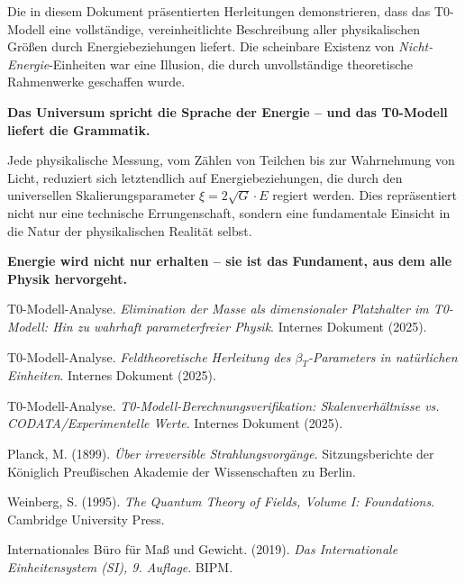 \documentclass[12pt,a4paper]{article}
\newcommand{\xipar}{\xi}
\begin{document}
	Die in diesem Dokument präsentierten Herleitungen demonstrieren, dass das T0-Modell eine vollständige, vereinheitlichte Beschreibung aller physikalischen Größen durch Energiebeziehungen liefert. Die scheinbare Existenz von \textit{Nicht-Energie}-Einheiten war eine Illusion, die durch unvollständige theoretische Rahmenwerke geschaffen wurde.
	
	\textbf{Das Universum spricht die Sprache der Energie -- und das T0-Modell liefert die Grammatik.}
	
	Jede physikalische Messung, vom Zählen von Teilchen bis zur Wahrnehmung von Licht, reduziert sich letztendlich auf Energiebeziehungen, die durch den universellen Skalierungsparameter $\xipar = 2\sqrt{G} \cdot E$ regiert werden. Dies repräsentiert nicht nur eine technische Errungenschaft, sondern eine fundamentale Einsicht in die Natur der physikalischen Realität selbst.
	
	\textbf{Energie wird nicht nur erhalten -- sie ist das Fundament, aus dem alle Physik hervorgeht.}
	
	\begin{thebibliography}{9}
		T0-Modell-Analyse. \textit{Elimination der Masse als dimensionaler Platzhalter im T0-Modell: Hin zu wahrhaft parameterfreier Physik}. Internes Dokument (2025).
		
		T0-Modell-Analyse. \textit{Feldtheoretische Herleitung des $\beta_T$-Parameters in natürlichen Einheiten}. Internes Dokument (2025).
		
		T0-Modell-Analyse. \textit{T0-Modell-Berechnungsverifikation: Skalenverhältnisse vs. CODATA/Experimentelle Werte}. Internes Dokument (2025).
		
		Planck, M. (1899). \textit{Über irreversible Strahlungsvorgänge}. Sitzungsberichte der Königlich Preußischen Akademie der Wissenschaften zu Berlin.
		
		Weinberg, S. (1995). \textit{The Quantum Theory of Fields, Volume I: Foundations}. Cambridge University Press.
		
		Internationales Büro für Maß und Gewicht. (2019). \textit{Das Internationale Einheitensystem (SI), 9. Auflage}. BIPM.
	\end{thebibliography}
	
\end{document}
